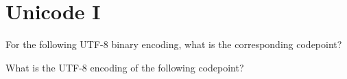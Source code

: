\frmrule


\section{Unicode I}







\begin{example}
For the following UTF-8 binary encoding, what is the corresponding codepoint?
\end{example}

\begin{example}
What is the UTF-8 encoding of the following codepoint?
\end{example}